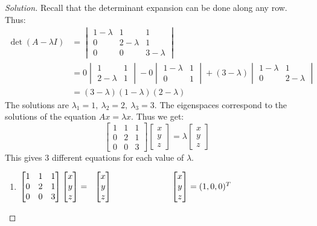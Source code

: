 \documentclass{article}
\theoremstyle{mystyle}
\begin{document}
\begin{proof}[Solution]
Recall that the determinant expansion can be done along any row. Thus:
\begin{align*}
    \det(A-\lambda I) &= \begin{vmatrix} 1-\lambda & 1 & 1 \\ 0 & 2-\lambda & 1 \\ 0 & 0 & 3-\lambda \end{vmatrix}\\
    &= 0\begin{vmatrix} 1 & 1 \\ 2-\lambda & 1 \end{vmatrix} - 0 \begin{vmatrix} 1-\lambda & 1 \\ 0 & 1 \end{vmatrix} + (3-\lambda)\begin{vmatrix} 1-\lambda & 1 \\ 0 & 2-\lambda\end{vmatrix}\\
    &= (3-\lambda)(1-\lambda)(2-\lambda)    
\end{align*}
The solutions are $\lambda_1 = 1,\ \lambda_2 = 2,\ \lambda_3 = 3$. The eigenspaces correspond to the solutions of the equation $Ax = \lambda x$. Thus we get:
\begin{equation*}
    \begin{bmatrix} 1 & 1 & 1 \\ 0 & 2 & 1 \\ 0 & 0 & 3 \end{bmatrix}\begin{bmatrix} x \\ y \\ z \end{bmatrix} = \lambda \begin{bmatrix}x \\ y \\ z\end{bmatrix}    
\end{equation*}
This gives 3 different equations for each value of $\lambda$.
\begin{enumerate}
    \item $\begin{bmatrix} 1 & 1 & 1 \\ 0 & 2 & 1 \\ 0 & 0 & 3 \end{bmatrix}\begin{bmatrix} x \\ y \\ z \end{bmatrix} = \ \  \begin{bmatrix}x \\ y \\ z\end{bmatrix}\hspace{2.48 cm} \begin{bmatrix} x \\ y \\ z \end{bmatrix} = (1,0,0)^T$

\end{enumerate}
\end{proof}
\end{document}
